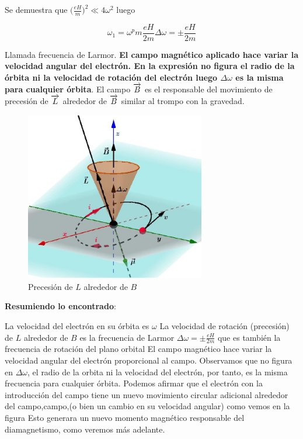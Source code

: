 Se demuestra que $\big(\frac{eH}{m}\big)^{2}\ll 4\omega^{2}$ luego

\begin{equation}
	\omega_{1}= \omega^pm\frac{eH}{2m}\Delta\omega=\pm\frac{eH}{2m}
\end{equation}

Llamada frecuencia de Larmor. \textbf{El campo magnético aplicado hace variar la velocidad angular del electrón. En la expresión no figura el radio de la órbita ni la velocidad de rotación del electrón luego $\Delta\omega$ es la misma para cualquier órbita}. El campo $\overrightarrow{B}$ es el responsable del movimiento de precesión de $\overrightarrow{L}$ alrededor de $\overrightarrow{B}$ similar al trompo con la gravedad.

\begin{figure}[H]
    \centering
    \includegraphics[width=0.7\textwidth]{./Figures/fig_s10}
	\caption{Precesión de $L$ alrededor de $B$}
	\label{fig:s10}
\end{figure}

\textbf{Resumiendo lo encontrado}:

La velocidad del electrón en su órbita es $\omega$ La velocidad de rotación (precesión) de $L$ alrededor de $B$ es la frecuencia de Larmor $\Delta\omega=\pm\frac{eH}{2m}$ que es también la
frecuencia de rotación del plano orbital El campo magnético hace variar la velocidad angular del electrón proporcional al campo. Observamos que no figura en $\Delta\omega$, el radio de la orbita ni la velocidad del electrón, por tanto, es la misma frecuencia para cualquier órbita.
Podemos afirmar que el electrón con la introducción del campo tiene un nuevo movimiento circular adicional alrededor del campo,campo,(o bien un cambio en su velocidad angular) como vemos en la
figura Esto generara un nuevo momento magnético responsable del diamagnetismo, como veremos más
adelante.




















